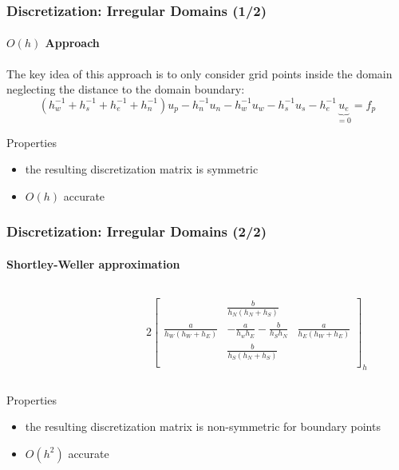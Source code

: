 \documentclass[xcolor=pdftex,table,10pt]{beamer}
\begin{document}
    \begin{frame}
		\frametitle{Discretization: Irregular Domains (1/2)}
		\framesubtitle{$O(h)$ Approach}

		The key idea of this approach is to only consider grid points inside the domain neglecting the distance to the domain boundary:
		\[
			(h_w^{-1}+h_s^{-1}+h_e^{-1}+h_n^{-1})u_p - h_n^{-1} u_n - h_w^{-1} u_w - h_s^{-1} u_s - h_e^{-1} \underbrace{u_e}_{=0} = f_p
		\]

		\vspace{0.5cm}
	
		\begin{alertblock}{Properties}
		\begin{itemize}
			\item the resulting discretization matrix is symmetric
			\item $O(h)$ accurate
		\end{itemize}
		\end{alertblock}

	\end{frame}
	
	\begin{frame}
		\frametitle{Discretization: Irregular Domains (2/2)}
		\framesubtitle{Shortley-Weller approximation}
	
		\begin{columns}
		\begin{column}{4cm}	
			
		\end{column}
		\begin{column}{6.5cm}	
		\small{	
			\[
				2 \begin{bmatrix}
				& \frac{b}{h_N (h_N + h_S)} & \\ 
                \frac{a}{h_W (h_W + h_E)} & -\frac{a}{h_w h_E} -\frac{b}{h_S h_N} & \frac{a}{h_E (h_W + h_E)} \\
                & \frac{b}{h_S (h_N + h_S)} & \\
                \end{bmatrix}_h
			\] 
		}
		\end{column}
		\end{columns}
		
		\begin{alertblock}{Properties}
		\begin{itemize}
			\item the resulting discretization matrix is non-symmetric for boundary points
			\item $O(h^2)$ accurate
		\end{itemize}
		\end{alertblock}

	\end{frame}
\end{document}
